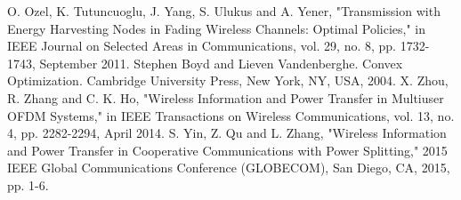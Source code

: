 \documentclass[12pt, draftclsnofoot, onecolumn]{IEEEtran}
\begin{document}
\begin{thebibliography}{99}
O. Ozel, K. Tutuncuoglu, J. Yang, S. Ulukus and A. Yener, "Transmission with Energy Harvesting Nodes in Fading Wireless Channels: Optimal Policies," in IEEE Journal on Selected Areas in Communications, vol. 29, no. 8, pp. 1732-1743, September 2011.
Stephen Boyd and Lieven Vandenberghe. Convex Optimization. Cambridge University Press, New York, NY, USA, 2004.
X. Zhou, R. Zhang and C. K. Ho, "Wireless Information and Power Transfer in Multiuser OFDM Systems," in IEEE Transactions on Wireless Communications, vol. 13, no. 4, pp. 2282-2294, April 2014.
S. Yin, Z. Qu and L. Zhang, "Wireless Information and Power Transfer in Cooperative Communications with Power Splitting," 2015 IEEE Global Communications Conference (GLOBECOM), San Diego, CA, 2015, pp. 1-6.
\end{thebibliography}


%
%
\vspace{-2cm}



%
%
%
%
%

% 
\end{document}
